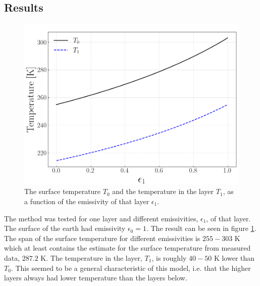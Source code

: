 \documentclass[twocolumn]{article}
\begin{document}
\begin{large}
\subsection*{Results}
\begin{figure}[!b]
    \begin{center}
        \includegraphics[scale=0.35]{OneLayer.png}
    \end{center}
    \caption{The surface temperature $T_0$ and the temperature in the layer $T_1$, as a function of the emissivity of that layer $\epsilon_1$.}
    \label{9maj1827}
\end{figure}
The method was tested for one layer and different emissivities, $\epsilon_1$, of that layer. The surface of the earth had emissivity $\epsilon_0=1$. The result can be seen in figure \ref{9maj1827}. The span of the surface temperature for different emissivities is $255-303$ K which at least contains the estimate for the surface temperature from measured data, $287.2$ K. The temperature in the layer, $T_1$, is roughly $40-50$ K lower than $T_0$. This seemed to be a general characteristic of this model, i.e. that the higher layers always had lower temperature than the layers below. 




























\end{large}
\end{document}
